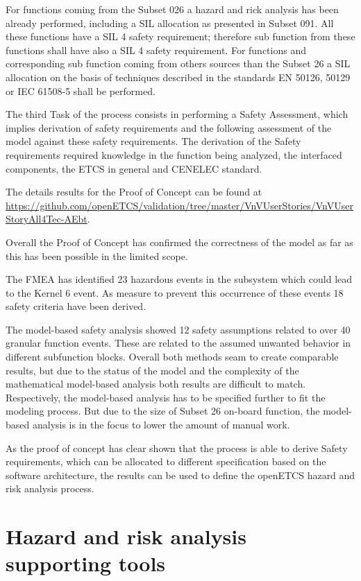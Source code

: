 \documentclass{template/openetcs_report}
\begin{document}
For functions coming from the Subset 026 a hazard and rick analysis has been already performed, including a SIL allocation as presented in Subset 091. All these functions have a SIL 4 safety requirement; therefore sub function from these functions shall have also a SIL 4 safety requirement. For functions and corresponding sub function coming from others sources than the Subset 26 a SIL allocation on the basis of techniques described in the standards EN 50126, 50129 or IEC 61508-5 shall be performed.
 
The third Task of the process consists in performing a Safety Assessment, which implies derivation of safety requirements and the following assessment of the model against these safety requirements. The derivation of the Safety requirements required knowledge in the function being analyzed, the interfaced components, the ETCS in general and CENELEC standard.
 
 
The details results for the Proof of Concept can be found at \url{https://github.com/openETCS/validation/tree/master/VnVUserStories/VnVUserStoryAll4Tec-AEbt}. 

Overall the Proof of Concept has confirmed the correctness of the model as far as this has been possible in the limited scope. 

The FMEA has identified 23 hazardous events in the subsystem which could lead to the Kernel 6 event. As measure to prevent this occurrence of these events 18 safety criteria have been derived.  

The model-based safety analysis showed 12 safety assumptions related to over 40 granular function events. These are related to the assumed unwanted behavior in different subfunction blocks. Overall both methods seam to create comparable results, but due to the status of the model and the complexity of the mathematical model-based analysis both results are difficult to match. Respectively, the model-based analysis has to be specified further to fit the modeling process. But due to the size of Subset 26 on-board function, the model-based analysis is in the focus to lower the amount of manual work.
 
As the proof of concept has clear shown that the process is able to derive Safety requirements, which can be allocated to different specification based on the software architecture, the results can be used to define the openETCS hazard and risk analysis process.
 
\section{Hazard and risk analysis supporting tools}
\end{document}
